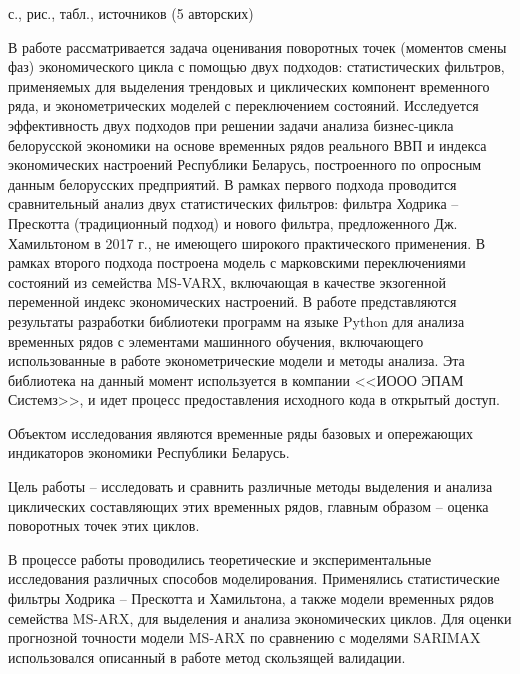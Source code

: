 \documentclass[a4paper,14pt]{extreport}
\begin{document}
	\maketitle
	

	\clearpage
	
	\bsureferat
	{
		\cntpages с., \cntimages рис., \cnttables табл., 
		\cntsources источников (5 авторских)
	}
	{
		В работе рассматривается задача оценивания поворотных точек (моментов смены фаз) экономического цикла  с помощью двух подходов: статистических фильтров, применяемых для выделения трендовых и циклических компонент временного ряда, и эконометрических моделей с переключением состояний.  Исследуется эффективность двух подходов при решении задачи анализа бизнес-цикла белорусской экономики на основе временных рядов реального ВВП и индекса экономических настроений Республики Беларусь, построенного по опросным данным белорусских предприятий. В рамках первого подхода проводится сравнительный анализ двух статистических фильтров: фильтра Ходрика – Прескотта (традиционный подход) и нового фильтра, предложенного Дж. Хамильтоном в 2017 г., не имеющего широкого практического применения. В рамках второго подхода построена модель с марковскими переключениями состояний из семейства MS-VARX, включающая в качестве экзогенной переменной индекс экономических настроений. В работе представляются результаты разработки библиотеки программ на языке Python для анализа временных рядов с элементами машинного обучения, включающего использованные в работе эконометрические модели и методы анализа. Эта библиотека на данный момент используется в компании <<ИООО ЭПАМ Системз>>, и идет процесс предоставления исходного кода в открытый доступ.
		
		\iffalse
		Объектом исследования являются временные ряды базовых и опережающих индикаторов экономики Республики Беларусь.
		
		Цель работы -- исследовать и сравнить различные методы выделения и анализа циклических составляющих этих временных рядов, главным образом -- оценка поворотных точек этих циклов.
		
		В процессе работы проводились теоретические и экспериментальные исследования различных способов моделирования. Применялись статистические фильтры Ходрика -- Прескотта и Хамильтона, а также модели временных рядов семейства MS-ARX, для выделения и анализа экономических циклов. Для оценки прогнозной точности модели MS-ARX по сравнению с моделями SARIMAX использовался описанный в работе метод скользящей валидации.
		
}
\end{document}
